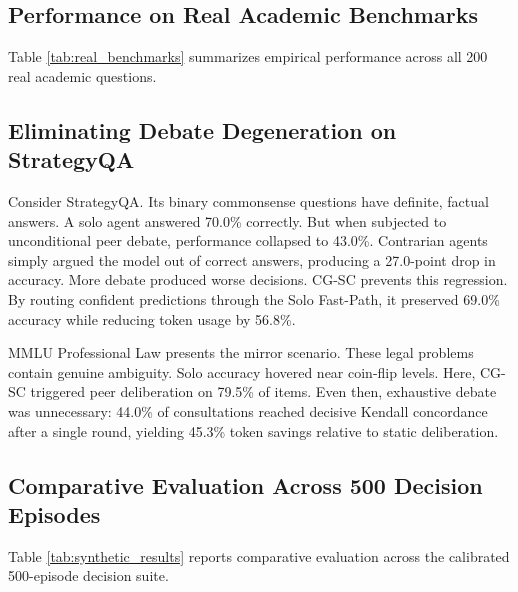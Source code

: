 \documentclass[conference]{IEEEtran}
\begin{document}
\subsection{Performance on Real Academic Benchmarks}
Table \ref{tab:real_benchmarks} summarizes empirical performance across all 200 real academic questions.

\begin{table}[htbp]
\caption{Empirical Benchmark Evaluation on Real Academic Questions ($N = 200$)}
\label{tab:real_benchmarks}
\centering
\setlength{\tabcolsep}{4pt}
\end{table}

\subsection{Eliminating Debate Degeneration on StrategyQA}
Consider StrategyQA. Its binary commonsense questions have definite, factual answers. A solo agent answered 70.0\% correctly. But when subjected to unconditional peer debate, performance collapsed to 43.0\%. Contrarian agents simply argued the model out of correct answers, producing a 27.0-point drop in accuracy. More debate produced worse decisions. CG-SC prevents this regression. By routing confident predictions through the Solo Fast-Path, it preserved 69.0\% accuracy while reducing token usage by 56.8\%.

MMLU Professional Law presents the mirror scenario. These legal problems contain genuine ambiguity. Solo accuracy hovered near coin-flip levels. Here, CG-SC triggered peer deliberation on 79.5\% of items. Even then, exhaustive debate was unnecessary: 44.0\% of consultations reached decisive Kendall concordance after a single round, yielding 45.3\% token savings relative to static deliberation.

\subsection{Comparative Evaluation Across 500 Decision Episodes}
Table \ref{tab:synthetic_results} reports comparative evaluation across the calibrated 500-episode decision suite.
\end{document}
